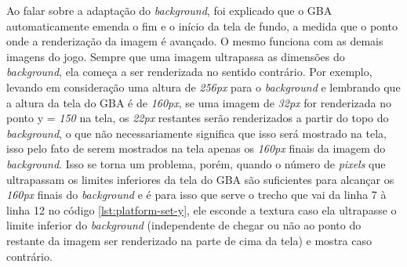 Ao falar sobre a adaptação do \textit{background}, foi explicado que o GBA automaticamente emenda o fim e o início da tela de fundo, a medida que o ponto onde a renderização da imagem é avançado. O mesmo funciona com as demais imagens do jogo. Sempre que uma imagem ultrapassa as dimensões do \textit{background}, ela começa a ser renderizada no sentido contrário. Por exemplo, levando em consideração uma altura de \textit{256px} para o \textit{background} e lembrando que a altura da tela do GBA é de \textit{160px}, se uma imagem de \textit{32px} for renderizada no ponto y = \textit{150} na tela, os \textit{22px} restantes serão renderizados a partir do topo do \textit{background}, o que não necessariamente significa que isso será mostrado na tela, isso pelo fato de serem mostrados na tela apenas os \textit{160px} finais da imagem do \textit{background}. Isso se torna um problema, porém, quando o número de \textit{pixels} que ultrapassam os limites inferiores da tela do GBA são suficientes para alcançar os \textit{160px} finais do \textit{background} e é para isso que serve o trecho que vai da linha 7 à linha 12 no código \ref{lst:platform-set-y}, ele esconde a textura caso ela ultrapasse o limite inferior do \textit{background} (independente de chegar ou não ao ponto do restante da imagem ser renderizado na parte de cima da tela) e mostra caso contrário.
